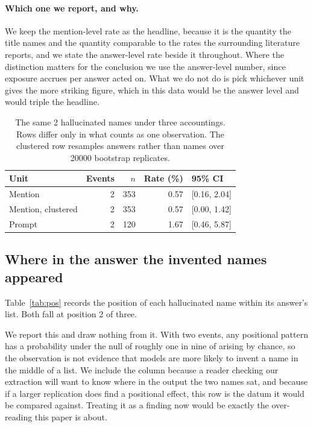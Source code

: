 \documentclass[journal]{IEEEtran}
\theoremstyle{definition}
\newcommand{\Nhall}{2}
\newcommand{\UBoot}{20000}
\newcommand{\UPosBoth}{2}
\begin{document}
\paragraph{Which one we report, and why.} We keep the mention-level rate as the
headline, because it is the quantity the title names and the quantity comparable
to the rates the surrounding literature reports, and we state the answer-level
rate beside it throughout. Where the distinction matters for the conclusion we
use the answer-level number, since exposure accrues per answer acted on. What we
do not do is pick whichever unit gives the more striking figure, which in this
data would be the answer level and would triple the headline.

\begin{table}[t]
\caption{The same \Nhall{} hallucinated names under three accountings. Rows
differ only in what counts as one observation. The clustered row resamples
answers rather than names over \UBoot{} bootstrap replicates.}
\label{tab:unit}
\centering
\small
\setlength{\tabcolsep}{5pt}
\begin{tabular}{@{}lrrrl@{}}
\toprule
Unit & Events & $n$ & Rate (\%) & 95\% CI \\
\midrule
Mention & 2 & 353 & 0.57 & [0.16, 2.04] \\
Mention, clustered & 2 & 353 & 0.57 & [0.00, 1.42] \\
Prompt & 2 & 120 & 1.67 & [0.46, 5.87] \\
\bottomrule
\end{tabular}
\end{table}

\subsection{Where in the answer the invented names appeared}
\label{sec:pos}

Table~\ref{tab:pos} records the position of each hallucinated name within its
answer's list. Both fall at position \UPosBoth{} of three.

We report this and draw nothing from it. With two events, any positional pattern
has a probability under the null of roughly one in nine of arising by chance, so
the observation is not evidence that models are more likely to invent a name in
the middle of a list. We include the column because a reader checking our
extraction will want to know where in the output the two names sat, and because
if a larger replication does find a positional effect, this row is the datum it
would be compared against. Treating it as a finding now would be exactly the
over-reading this paper is about.
\end{document}
